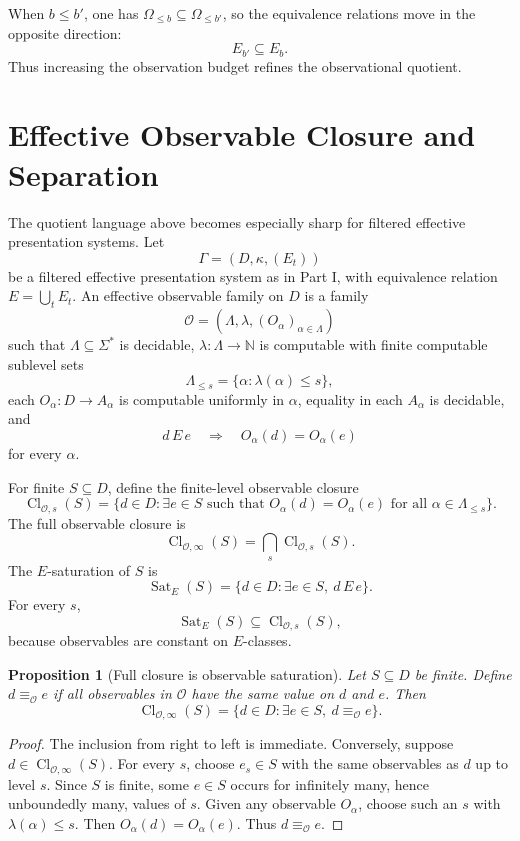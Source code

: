 \documentclass[11pt]{article}
\newtheorem{proposition}[theorem]{Proposition}
\theoremstyle{definition}
\theoremstyle{remark}
\begin{document}
When \(b\leq b'\), one has \(\Omega_{\leq b}\subseteq \Omega_{\leq b'}\), so the equivalence relations move in the opposite direction:
\[
E_{b'}\subseteq E_b.
\]
Thus increasing the observation budget refines the observational quotient.

\section{Effective Observable Closure and Separation}

The quotient language above becomes especially sharp for filtered effective presentation systems.  Let
\[
\Gamma=(D,\kappa,(E_t))
\]
be a filtered effective presentation system as in Part I, with equivalence relation \(E=\bigcup_tE_t\).  An effective observable family on \(D\) is a family
\[
\mathcal O=(\Lambda,\lambda,(O_\alpha)_{\alpha\in\Lambda})
\]
such that \(\Lambda\subseteq\Sigma^*\) is decidable, \(\lambda:\Lambda\to\mathbb N\) is computable with finite computable sublevel sets
\[
\Lambda_{\leq s}=\{\alpha:\lambda(\alpha)\leq s\},
\]
each \(O_\alpha:D\to A_\alpha\) is computable uniformly in \(\alpha\), equality in each \(A_\alpha\) is decidable, and
\[
d\,E\,e\quad\Longrightarrow\quad O_\alpha(d)=O_\alpha(e)
\]
for every \(\alpha\).

For finite \(S\subseteq D\), define the finite-level observable closure
\[
\operatorname{Cl}_{\mathcal O,s}(S)
=
\{d\in D:\exists e\in S\text{ such that }O_\alpha(d)=O_\alpha(e)
\text{ for all }\alpha\in\Lambda_{\leq s}\}.
\]
The full observable closure is
\[
\operatorname{Cl}_{\mathcal O,\infty}(S)=\bigcap_s\operatorname{Cl}_{\mathcal O,s}(S).
\]
The \(E\)-saturation of \(S\) is
\[
\operatorname{Sat}_E(S)=\{d\in D:\exists e\in S,\ d\,E\,e\}.
\]
For every \(s\),
\[
\operatorname{Sat}_E(S)\subseteq \operatorname{Cl}_{\mathcal O,s}(S),
\]
because observables are constant on \(E\)-classes.

\begin{proposition}[Full closure is observable saturation]
Let \(S\subseteq D\) be finite.  Define \(d\equiv_{\mathcal O}e\) if all observables in \(\mathcal O\) have the same value on \(d\) and \(e\).  Then
\[
\operatorname{Cl}_{\mathcal O,\infty}(S)
=
\{d\in D:\exists e\in S,\ d\equiv_{\mathcal O}e\}.
\]
\end{proposition}

\begin{proof}
The inclusion from right to left is immediate.  Conversely, suppose \(d\in\operatorname{Cl}_{\mathcal O,\infty}(S)\).  For every \(s\), choose \(e_s\in S\) with the same observables as \(d\) up to level \(s\).  Since \(S\) is finite, some \(e\in S\) occurs for infinitely many, hence unboundedly many, values of \(s\).  Given any observable \(O_\alpha\), choose such an \(s\) with \(\lambda(\alpha)\leq s\).  Then \(O_\alpha(d)=O_\alpha(e)\).  Thus \(d\equiv_{\mathcal O}e\).
\end{proof}
\end{document}

